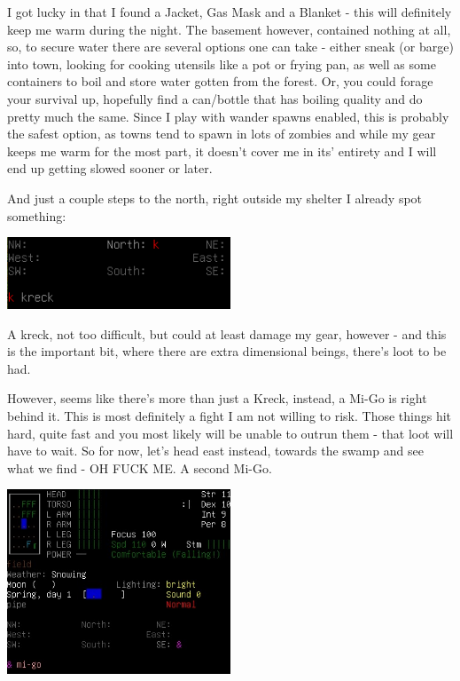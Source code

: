\documentclass[11pt]{report}
\begin{document}
I got lucky in that I found a Jacket, Gas Mask and a Blanket - this will definitely keep me warm during the night.
The basement however, contained nothing at all, so, to secure water there are several options one can take - either sneak (or barge) into town, looking for cooking utensils like a pot or frying pan, as well as some containers to boil and store water gotten from the forest. Or, you could forage your survival up, hopefully find a can/bottle that has boiling quality and do pretty much the same. Since I play with wander spawns enabled, this is probably the safest option, as towns tend to spawn in lots of zombies and while my gear keeps me warm for the most part, it doesn't cover me in its' entirety and I will end up getting slowed sooner or later.

And just a couple steps to the north, right outside my shelter I already spot something:

\begin{center}
    \includegraphics[width=0.5\textwidth]{08}
\end{center}

A kreck, not too difficult, but could at least damage my gear, however - and this is the important bit, where there are extra dimensional beings, there's loot to be had.

However, seems like there's more than just a Kreck, instead, a Mi-Go is right behind it. This is most definitely a fight I am not willing to risk. Those things hit hard, quite fast and you most likely will be unable to outrun them - that loot will have to wait.
So for now, let's head east instead, towards the swamp and see what we find - OH FUCK ME. A second Mi-Go.

\begin{center}
    \includegraphics[width=0.5\textwidth]{09}
\end{center}
\end{document}
